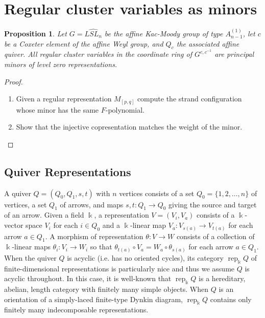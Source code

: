 \documentclass[12pt]{amsart}
\newcommand{\kk}{\Bbbk}%
\newcommand{\rep}{\operatorname{rep}}
\newtheorem{proposition}[theorem]{Proposition}
\theoremstyle{remark}
\numberwithin{equation}{section}
\begin{document}
\section{Regular cluster variables as minors}

\begin{proposition}\label{prop:level zero}
Let $G = \widehat{LSL_n}$ be the affine Kac-Moody group of type $A_{n-1}^{(1)}$, let $c$ be a Coxeter element of the affine Weyl group, and $Q_c$ the associated affine quiver.  All regular cluster variables in the coordinate ring of $G^{c,c^{-1}}$ are principal minors of level zero representations.  
\end{proposition}
\begin{proof}
\begin{enumerate}
\item Given a regular representation $M_{[p,q]}$ compute the strand configuration whose minor has the same $F$-polynomial.
\item Show that the injective copresentation matches the weight of the minor.
\end{enumerate}
\end{proof}

\subsection{Quiver Representations}
  A quiver $Q=(Q_0,Q_1,s,t)$ with $n$ vertices consists of a set $Q_0=\{1,2,\ldots,n\}$ of vertices, a set $Q_1$ of arrows, and maps $s,t:Q_1\to Q_0$ giving the source and target of an arrow.  
  Given a field $\kk$, a representation $V=(V_i,V_a)$ consists of a $\kk$-vector space $V_i$ for each $i\in Q_0$ and a $\kk$-linear map $V_a:V_{s(a)}\to V_{t(a)}$ for each arrow $a\in Q_1$.  
  A morphism of representation $\theta:V\to W$ consists of a collection of $\kk$-linear maps $\theta_i:V_i\to W_i$ so that $\theta_{t(a)}\circ V_a=W_a\circ \theta_{s(a)}$ for each arrow $a\in Q_1$.  
  When the quiver $Q$ is acyclic (i.e. has no oriented cycles), its category $\rep_\kk Q$ of finite-dimensional representations is particularly nice and thus we assume $Q$ is acyclic throughout.  
  In this case, it is well-known that $\rep_\kk Q$ is a hereditary, abelian, length category with finitely many simple objects.  
  When $Q$ is an orientation of a simply-laced finite-type Dynkin diagram, $\rep_\kk Q$ contains only finitely many indecomposable representations.
\end{document}
